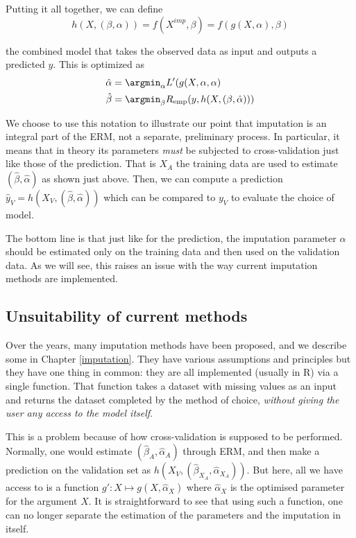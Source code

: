 Putting it all together, we can define 
$$ h(X, (\beta, \alpha)) = f(X^{imp}, \beta) = f( g(X, \alpha), \beta) $$

the combined model that takes the observed data as input and outputs a predicted $y$. This is optimized as 
\begin{align*}
\hat{\alpha} &= \argmin_{\alpha} L'(g(X,\alpha, \alpha) \\
\hat{\beta} &= \argmin_{\beta} R_{\text{emp}}(y, h(X, (\beta, \hat{\alpha})))
\end{align*}

We choose to use this notation to illustrate our point that imputation is an integral part of the ERM, not a separate, preliminary process. In particular, it means that in theory its parameters \emph{must} be subjected to cross-validation just like those of the prediction. That is $X_A$ the training data are used to estimate $(\hat{\beta}, \hat{\alpha})$ as shown just above. Then, we can compute a prediction $\hat{y}_V = h(X_V, (\hat{\beta}, \hat{\alpha}))$ which can be compared to $y_V$ to evaluate the choice of model.

The bottom line is that just like for the prediction, the imputation parameter $\alpha$ should be estimated only on the training data and then used on the validation data. As we will see, this raises an issue with the way current imputation methods are implemented.

		\subsection{Unsuitability of current methods}
Over the years, many imputation methods have been proposed, and we describe some in Chapter \ref{imputation}. They have various assumptions and principles but they have one thing in common: they are all implemented (usually in R) via a single function. That function takes a dataset with missing values as an input and returns the dataset completed by the method of choice, \emph{without giving the user any access to the model itself}.

This is a problem because of how cross-validation is supposed to be performed. Normally, one would estimate $(\hat{\beta}_A, \hat{\alpha}_A)$ through ERM, and then make a prediction on the validation set as $h(X_V,(\hat{\beta}_{X_A},\hat{\alpha}_{X_A}))$. But here, all we have access to is a function $g': X \mapsto g(X, \hat{\alpha}_X)$ where $\hat{\alpha}_X$ is the optimised parameter for the argument $X$. It is straightforward to see that using such a function, one can no longer separate the estimation of the parameters and the imputation in itself.
	
